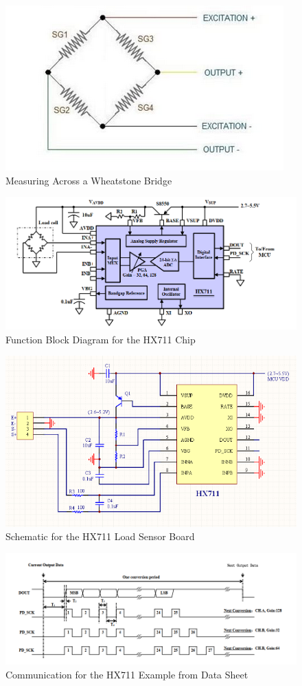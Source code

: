 \documentclass[11pt]{article}
\begin{document}
\begin{figure}[H]
	\centering
	\includegraphics[width = 0.4\linewidth]{bridgeConnefiguration}
	\caption{Measuring Across a Wheatstone Bridge}
	\label{fig:loadboard}
\end{figure}
\begin{figure}[H]
	\centering
	\includegraphics[width = 0.7\linewidth]{hx711applicationBlock}
	\caption{Function Block Diagram for the HX711 Chip}
	\label{fig:hx711blocks}
\end{figure}
\begin{figure}[H]
	\centering
	\includegraphics[width = 0.7\linewidth]{HX711}
	\caption{Schematic for the HX711 Load Sensor Board}
	\label{fig:HX711}
\end{figure}
\begin{figure}[H]
	\centering
	\includegraphics[width = 0.8\linewidth]{exampleDatashaeet}
	\caption{Communication for the HX711 Example from Data Sheet}
	\label{fig:hx711Communication}
\end{figure}
\end{document}
